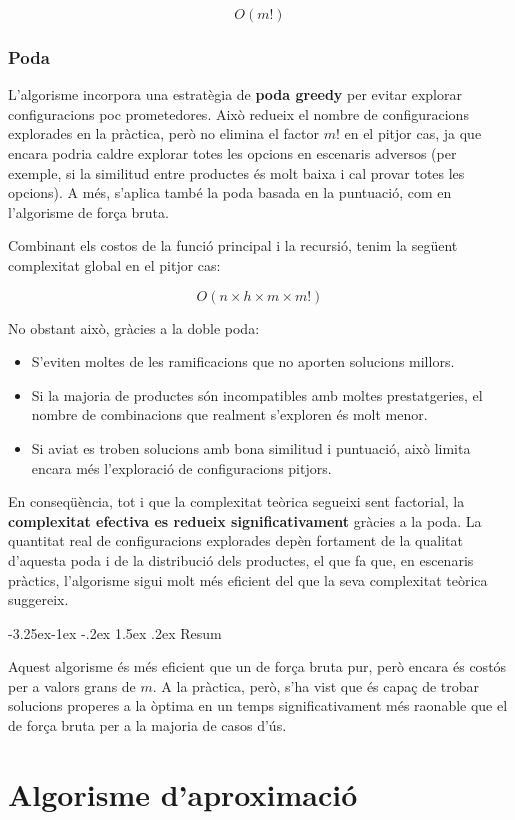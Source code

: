 \documentclass[a4paper,12pt]{report}
\makeatletter
\newcounter{subsubsubsection}[subsubsection]
\newcommand\subsubsubsection{\@startsection{subsubsubsection}{4}{\z@}%
									 {-3.25ex\@plus -1ex \@minus -.2ex}%
									 {1.5ex \@plus .2ex}%
									 {\normalfont\normalsize\bfseries}}
\makeatother
\begin{document}
\[
O(m!)
\]

\subsubsection{Poda}

L'algorisme incorpora una estratègia de \textbf{poda greedy} per evitar explorar configuracions poc prometedores. Això redueix el nombre de configuracions explorades en la pràctica, però no elimina el factor \(m!\) en el pitjor cas, ja que encara podria caldre explorar totes les opcions en escenaris adversos (per exemple, si la similitud entre productes és molt baixa i cal provar totes les opcions).
A més, s'aplica també la poda basada en la puntuació, com en l'algorisme de força bruta.

Combinant els costos de la funció principal i la recursió, tenim la següent complexitat global en el pitjor cas:

\[
O(n \times h \times m \times m!)
\]

No obstant això, gràcies a la doble poda:
\begin{itemize}
    \item S'eviten moltes de les ramificacions que no aporten solucions millors.
    \item Si la majoria de productes són incompatibles amb moltes prestatgeries, el nombre de combinacions que realment s'exploren és molt menor.
    \item Si aviat es troben solucions amb bona similitud i puntuació, això limita encara més l'exploració de configuracions pitjors.
\end{itemize}

En conseqüència, tot i que la complexitat teòrica segueixi sent factorial, la \textbf{complexitat efectiva es redueix significativament} gràcies a la poda. La quantitat real de configuracions explorades depèn fortament de la qualitat d'aquesta poda i de la distribució dels productes, el que fa que, en escenaris pràctics, l'algorisme sigui molt més eficient del que la seva complexitat teòrica suggereix.

\subsubsubsection{Resum}

Aquest algorisme és més eficient que un de força bruta pur, però encara és costós per a valors grans de \(m\). A la pràctica, però, s'ha vist que és capaç de trobar solucions properes a la òptima en un temps significativament més raonable que el de força bruta per a la majoria de casos d'ús.

\section{Algorisme d'aproximació}
\end{document}
